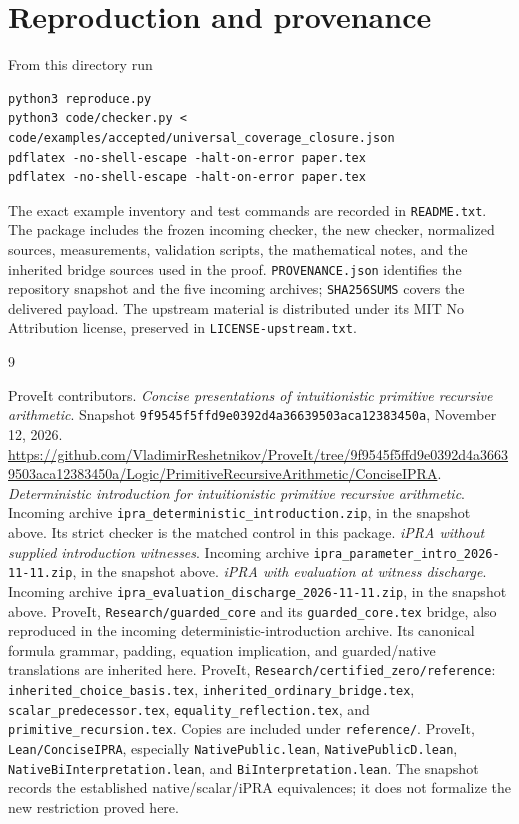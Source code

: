 \documentclass[11pt]{article}
\theoremstyle{definition}\newtheorem{definition}[theorem]{Definition}
\theoremstyle{remark}\newtheorem{remark}[theorem]{Remark}
\newcommand{\code}[1]{\texttt{#1}}
\begin{document}
\appendix


\section{Reproduction and provenance}

From this directory run
\begin{lstlisting}
python3 reproduce.py
python3 code/checker.py < code/examples/accepted/universal_coverage_closure.json
pdflatex -no-shell-escape -halt-on-error paper.tex
pdflatex -no-shell-escape -halt-on-error paper.tex
\end{lstlisting}
The exact example inventory and test commands are recorded in
\code{README.txt}. The package includes the frozen incoming checker,
the new checker, normalized sources, measurements, validation scripts,
the mathematical notes, and the inherited bridge sources used in the
proof. \code{PROVENANCE.json} identifies the repository snapshot and
the five incoming archives; \code{SHA256SUMS} covers the delivered
payload. The upstream material is distributed under its MIT No
Attribution license, preserved in \code{LICENSE-upstream.txt}.

\begin{thebibliography}{9}
\raggedright
{} ProveIt contributors.
\emph{Concise presentations of intuitionistic primitive recursive arithmetic}.
Snapshot \code{9f9545f5ffd9e0392d4a36639503aca12383450a},
November 12, 2026.
\url{https://github.com/VladimirReshetnikov/ProveIt/tree/9f9545f5ffd9e0392d4a36639503aca12383450a/Logic/PrimitiveRecursiveArithmetic/ConciseIPRA}.
 \emph{Deterministic introduction for intuitionistic
primitive recursive arithmetic}. Incoming archive
\code{ipra\_deterministic\_introduction.zip}, in the snapshot above.
Its strict checker is the matched control in this package.
 \emph{iPRA without supplied introduction witnesses}.
Incoming archive \code{ipra\_parameter\_intro\_2026-11-11.zip},
in the snapshot above.
 \emph{iPRA with evaluation at witness discharge}.
Incoming archive \code{ipra\_evaluation\_discharge\_2026-11-11.zip},
in the snapshot above.
 ProveIt, \code{Research/guarded\_core} and its
\code{guarded\_core.tex} bridge, also reproduced in the incoming
deterministic-introduction archive. Its canonical formula grammar,
padding, equation implication, and guarded/native translations are
inherited here.
 ProveIt, \code{Research/certified\_zero/reference}:
\code{inherited\_choice\_basis.tex},
\code{inherited\_ordinary\_bridge.tex},
\code{scalar\_predecessor.tex},
\code{equality\_reflection.tex}, and
\code{primitive\_recursion.tex}. Copies are included under
\code{reference/}.
 ProveIt, \code{Lean/ConciseIPRA}, especially
\code{NativePublic.lean}, \code{NativePublicD.lean},
\code{NativeBiInterpretation.lean}, and \code{BiInterpretation.lean}.
The snapshot records the established native/scalar/iPRA equivalences;
it does not formalize the new restriction proved here.
\end{thebibliography}
\end{document}
